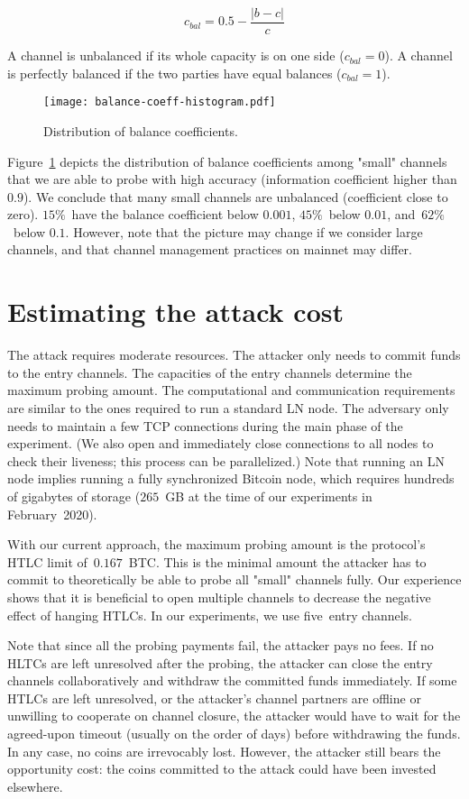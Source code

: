 \[c_{bal} = 0.5 - \frac{|b-c|}{c} \]

A channel is unbalanced if its whole capacity is on one side ($c_{bal} = 0$).
A channel is perfectly balanced if the two parties have equal balances ($c_{bal} = 1$).

\begin{figure}[h]
	\centering
	\texttt{[image: balance-coeff-histogram.pdf]}
	\caption{Distribution of balance coefficients.}
	\label{fig:balance-coeff-histogram}
\end{figure}

Figure~\ref{fig:balance-coeff-histogram} depicts the distribution of balance coefficients among "small" channels that we are able to probe with high accuracy (information coefficient higher than $0.9$).
We conclude that many small channels are unbalanced (coefficient close to zero).
$15\%$~have the balance coefficient below $0.001$, $45\%$~below $0.01$, and~$62\%$~below $0.1$.
However, note that the picture may change if we consider large channels, and that channel management practices on mainnet may differ.


\section{Estimating the attack cost}

The attack requires moderate resources.
The attacker only needs to commit funds to the entry channels.
The capacities of the entry channels determine the maximum probing amount.
The computational and communication requirements are similar to the ones required to run a standard LN node.
The adversary only needs to maintain a few TCP connections during the main phase of the experiment.
(We also open and immediately close connections to all nodes to check their liveness; this process can be parallelized.)
Note that running an LN node implies running a fully synchronized Bitcoin node, which requires hundreds of gigabytes of storage ($265$~GB at the time of our experiments in February~2020).

With our current approach, the maximum probing amount is the protocol's HTLC limit of~$0.167$~BTC\@.
This is the minimal amount the attacker has to commit to theoretically be able to probe all "small" channels fully.
Our experience shows that it is beneficial to open multiple channels to decrease the negative effect of hanging HTLCs.
In our experiments, we use five~entry channels.

Note that since all the probing payments fail, the attacker pays no fees.
If no HLTCs are left unresolved after the probing, the attacker can close the entry channels collaboratively and withdraw the committed funds immediately.
If some HTLCs are left unresolved, or the attacker's channel partners are offline or unwilling to cooperate on channel closure, the attacker would have to wait for the agreed-upon timeout (usually on the order of days) before withdrawing the funds.
In any case, no coins are irrevocably lost.
However, the attacker still bears the opportunity cost: the coins committed to the attack could have been invested elsewhere.

